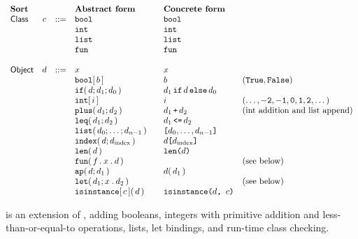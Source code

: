 \documentclass[11pt]{article}
\begin{document}
\[
\begin{array}{l c c l@{\qquad} l l}
\text{\bf Sort} &   &     & \text{\bf Abstract form}   & \text{\bf Concrete form} & \\
\Sort{Class}    & c & ::= & \dbooltag                  & \dbooltag \\
                &   &     & \dinttag                   & \dinttag \\
                &   &     & \dlisttag                  & \dlisttag \\
                &   &     & \dfuntag                   & \dfuntag \\
                &   &     &                            & \\
\Sort{Object}   & d & ::= & x                          & x \\
                &   &     & \dboolabt{b}               & \dboolcst{b}             & (\kw{True}, \kw{False}) \\
                &   &     & \difabt{d}{d_1}{d_0}       & \difcst{d}{d_1}{d_0} \\
                &   &     & \dintabt{i}                & \dintcst{i}              & (\dots, \kw{-2}, \kw{-1}, \kw{0}, \kw{1}, \kw{2}, \dots) \\
                &   &     & \dplusabt{d_1}{d_2}        & \dpluscst{d_1}{d_2}      & (\text{int addition and list append}) \\
                &   &     & \dleqabt{d_1}{d_2}         & \dleqcst{d_1}{d_2} \\
                &   &     & \dlistabt{\ZeqABT{n-1}{d}} & \dlistcst{d_0, \dots, d_{n-1}} \\
                &   &     & \dindexabt{d}{d_\text{index}} & \dindexcst{d}{d_\text{index}} \\
                &   &     & \dlenabt{d}                & \dlencst{d} \\
                &   &     & \dfunabt{f}{x}{d}          &                          & \text{(see below)} \\
                &   &     & \dappabt{d}{d_1}           & \dappcst{d}{d_1} \\
                &   &     & \dletabt{d_1}{x}{d_2}      &                          & \text{(see below)} \\
                &   &     & \disinstanceabt{d}{c}      & \disinstancecst{d}{c} \\
\end{array}
\]

\LangPyCF{} is an extension of \LangDPCF{}, adding booleans, integers with primitive addition and less-than-or-equal-to operations, lists, let bindings, and run-time class checking.
\end{document}
